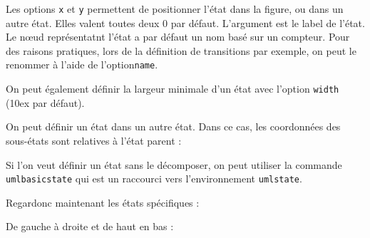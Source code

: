 \documentclass[a4paper,11pt]{report}
\newcommand{\inputTikZ}[1]{%
  }%
\newcommand{\inputTikZ}[1]{%
    \texttt{[image: fig/\#1.pdf]}%
  }%
\begin{document}
Les options {\tt x} et {\tt y} permettent de positionner l'état dans la figure, ou dans un autre état. Elles valent toutes deux 0 par défaut. L'argument est le label de l'état. Le n\oe{}ud représentatnt l'état a par défaut un nom basé sur un compteur. Pour des raisons pratiques, lors de la définition de transitions par exemple, on peut le renommer à l'aide de l'option{\tt name}.

\medskip

On peut également définir la largeur minimale d'un état avec l'option {\tt width} (10ex par défaut).

\medskip

On peut définir un état dans un autre état. Dans ce cas, les coordonnées des sous-états sont relatives à l'état parent :

\medskip

\begin{minipage}{0.51\textwidth}

\end{minipage}
\begin{minipage}{0.49\textwidth}
\begin{center}
\inputTikZ{figure52}
\end{center}
\end{minipage}

\medskip

Si l'on veut définir un état sans le décomposer, on peut utiliser la commande {\tt umlbasicstate} qui est un raccourci vers l'environnement {\tt umlstate}.

\medskip

Regardonc maintenant les états spécifiques :

\medskip

\begin{minipage}{0.51\textwidth}

\end{minipage}
\begin{minipage}{0.49\textwidth}
\begin{center}
\inputTikZ{figure53}
\end{center}
\end{minipage}

\medskip

De gauche à droite et de haut en bas :

\medskip
\end{document}
